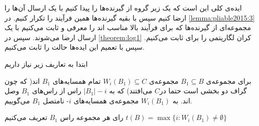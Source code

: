 ایده‌ی کلی این است که یک زیر گروه از گیرنده‌ها را پیدا کنیم با یک ارسال آن‌ها را ارضا کنیم سپس با بقیه گیرنده‌ها همین فرآیند را تکرار کنیم. در 
\autoref{lemma:pliable2015:3} 
مجموعه‌ای از گیرنده‌ها که برای فرآیند بالا مناسب اند را معرفی و ثابت می‌کنیم با یک ارسال ارضا می‌شوند. سپس در 
\autoref{theorem:log1}
 کران لگاریتمی را برای
 ثابت می‌کنیم. سپس با تعمیم این ایده‌ها حالت
 را ثابت می‌کنیم.

ابتدا به تعاریف زیر نیاز داریم
	\begin{definition}
	\label{def:nonnei}
	برای مجموعه‌ی
	$B_1 \subseteq B$
	مجموعه‌ی
	$W_i(B_1) \subseteq C$
	تمام همسایه‌های
	$B_1$
	اند( که چون گراف دو بخشی است حتما در$C$ می‌افتند) که به 
	$|B_1| - i$
	راس از راس‌های
	$B_1$
	وصل اند. به
	$W_i(B_1)$
	مجموعه‌ی همسایه‌های
	$i$-
	نامتصل 
	$B_1$
	می‌گوییم.
\end{definition}
\begin{definition}
	رای هر مجموعه‌ راس
	$B_1$
	تعریف می‌کنیم 
	$t(B) = \max\{i: W_i(B_1) \neq \emptyset \}$
\end{definition}

